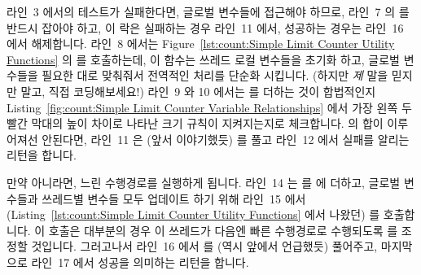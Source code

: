 라인~3 에서의 테스트가 실패한다면, 글로벌 변수들에 접근해야 하므로, 라인~7 의
 를 반드시 잡아야 하고, 이 락은 실패하는 경우 라인~11 에서,
성공하는 경우는 라인~16 에서 해제합니다.
라인~8 에서는 Figure~\ref{lst:count:Simple Limit Counter Utility Functions} 의
 를 호출하는데, 이 함수는 쓰레드 로컬 변수들을 초기화
하고, 글로벌 변수들을 필요한 대로 맞춰줘서 전역적인 처리를 단순화 시킵니다.
(하지만 \emph{제} 말을 믿지만 말고, 직접 코딩해보세요!)
라인~9 와 10 에서는  를 더하는 것이 합법적인지
Listing~\ref{fig:count:Simple Limit Counter Variable Relationships} 에서 가장
왼쪽 두 빨간 막대의 높이 차이로 나타난 크기 규칙이 지켜지는지로 체크합니다.
 의 합이 이루어져선 안된다면, 라인~11 은 (앞서 이야기했듯)
 를 풀고 라인~12 에서 실패를 알리는 리턴을 합니다.

만약 아니라면, 느린 수행경로를 실행하게 됩니다.
라인~14 는  를  에 더하고, 글로벌 변수들과 쓰레드별
변수들 모두 업데이트 하기 위해 라인~15 에서
(Listing~\ref{lst:count:Simple Limit Counter Utility Functions} 에서 나왔던)
 를 호출합니다.
이  호출은 대부분의 경우 이 쓰레드가 다음엔 빠른 수행경로로
수행되도록  를 조정할 것입니다.
그러고나서 라인~16 에서  를 (역시 앞에서 언급했듯) 풀어주고,
마지막으로 라인~17 에서 성공을 의미하는 리턴을 합니다.

